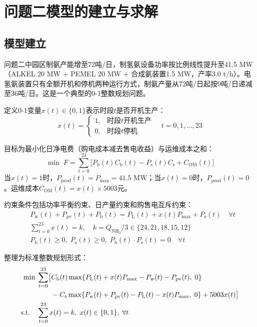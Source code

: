\section{问题二模型的建立与求解}

\subsection{模型建立}

问题二中园区制氨产能增至72吨/日，制氢氨设备功率按比例线性提升至41.5 MW（ALKEL 20 MW + PEMEL 20 MW + 合成氨装置1.5 MW，产率3.0 t/h）。电氢氨装置只有全额开机和停机两种运行方式，制氨产量从72吨/日起按9吨/日递减至36吨/日。这是一个典型的0-1整数规划问题。

定义0-1变量$x(t) \in \{0,1\}$表示时段$t$是否开机生产：
\begin{equation}
x(t) = \begin{cases}
1, & \text{时段}t\text{开机生产} \\
0, & \text{时段}t\text{停机}
\end{cases} \quad t = 0,1,\ldots,23
\end{equation}

目标为最小化日净电费（购电成本减去售电收益）与运维成本之和：
\begin{equation}
\min \; F = \sum_{t=0}^{23} \bigl[ P_{\mathrm{b}}(t)C_{\mathrm{b}}(t) - P_{\mathrm{s}}(t)C_{\mathrm{s}} + C_{\mathrm{OM}}(t) \bigr] \label{eq:q2_obj}
\end{equation}
当$x(t)=1$时，$P_{\mathrm{prod}}(t)=P_{\mathrm{max}}=41.5$ MW；当$x(t)=0$时，$P_{\mathrm{prod}}(t)=0$。运维成本$C_{\mathrm{OM}}(t) = x(t) \times 5003$元。

约束条件包括功率平衡约束、日产量约束和购售电互斥约束：
\begin{align}
&P_{\mathrm{w}}(t) + P_{\mathrm{pv}}(t) + P_{\mathrm{b}}(t) = P_{\mathrm{L}}(t) + x(t)P_{\mathrm{max}} + P_{\mathrm{s}}(t) \quad \forall t \label{eq:q2_bal} \\
&\sum_{t=0}^{23} x(t) = k,\quad k = Q_{\mathrm{NH_3}}/3 \in \{24,21,18,15,12\} \label{eq:q2_hours} \\
&P_{\mathrm{b}}(t) \ge 0,\; P_{\mathrm{s}}(t) \ge 0,\; P_{\mathrm{b}}(t) \cdot P_{\mathrm{s}}(t) = 0 \quad \forall t
\end{align}

整理为标准整数规划形式：
\begin{align}
\min \; & \sum_{t=0}^{23} \bigl[ C_{\mathrm{b}}(t)\max\{P_{\mathrm{L}}(t) + x(t)P_{\mathrm{max}} - P_{\mathrm{w}}(t) - P_{\mathrm{pv}}(t),\; 0\} \notag \\
&\qquad - C_{\mathrm{s}}\max\{P_{\mathrm{w}}(t) + P_{\mathrm{pv}}(t) - P_{\mathrm{L}}(t) - x(t)P_{\mathrm{max}},\; 0\} + 5003x(t) \bigr] \label{eq:q2_model} \\
\text{s.t.} \quad & \sum_{t=0}^{23} x(t) = k,\; x(t) \in \{0,1\},\; \forall t \notag
\end{align}

